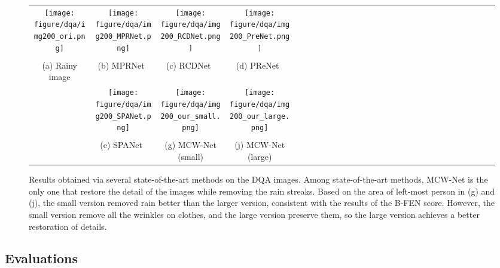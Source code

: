 \documentclass[a4paper,fleqn]{cas-dc}
\begin{document}
\begin{figure*}
	\centering
	\setlength{\tabcolsep}{0pt}
	\footnotesize{
	\begin{tabular}{cccccccclcccccccclcccccccclccccccccl}


		\multicolumn{3}{c}{\texttt{[image: figure/dqa/img200\_ori.png]}}\ &
		\multicolumn{3}{c}{\texttt{[image: figure/dqa/img200\_MPRNet.png]}}\ &
		\multicolumn{3}{c}{\texttt{[image: figure/dqa/img200\_RCDNet.png]}}\ &
		\multicolumn{3}{c}{\texttt{[image: figure/dqa/img200\_PreNet.png]}}\\ &
		\\
		
		\multicolumn{3}{c}{(a) Rainy image} &
		\multicolumn{3}{c}{(b) MPRNet~\cite{zamir2021multi}} &
		\multicolumn{3}{c}{(c) RCDNet~\cite{wang2020model}} &
		\multicolumn{3}{c}{(d) PReNet~\cite{ren2019progressive}} & \\

		\multicolumn{3}{c}{} & 
		\multicolumn{3}{c}{\texttt{[image: figure/dqa/img200\_SPANet.png]}}\ &
		\multicolumn{3}{c}{\texttt{[image: figure/dqa/img200\_our\_small.png]}}\ &
		\multicolumn{3}{c}{\texttt{[image: figure/dqa/img200\_our\_large.png]}}\\ &
        \\ 
        \multicolumn{3}{c}{} & 
		\multicolumn{3}{c}{(e) SPANet~\cite{wang2019spatial} } &
		\multicolumn{3}{c}{(g) MCW-Net (small)} &
		\multicolumn{3}{c}{(j) MCW-Net (large)} & \\
	\end{tabular}}
	\caption{Results obtained via several state-of-the-art methods on the DQA images. Among state-of-the-art methods, MCW-Net is the only one that restore the detail of the images while removing the rain streaks. Based on the area of left-most person in (g) and (j), the small version removed rain better than the larger version, consistent with the results of the B-FEN score. However, the small version remove all the wrinkles on clothes, and the large version preserve them, so the large version achieves a better restoration of details.}
	\label{fig:results dqa}
\end{figure*}



		





\subsection{Evaluations}
\label{subsec:Evaluations}
\end{document}
